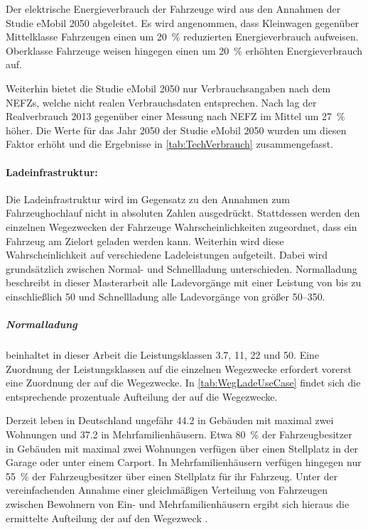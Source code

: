 

Der elektrische Energieverbrauch der Fahrzeuge wird aus den Annahmen der Studie \glqq eMobil \num{2050}\grqq{} \cite{Hacker2014} abgeleitet.
Es wird angenommen, dass Kleinwagen gegenüber Mittelklasse Fahrzeugen einen um \SI{20}{\percent} reduzierten Energieverbrauch aufweisen.
Oberklasse Fahrzeuge weisen hingegen einen um \SI{20}{\percent} erhöhten Energieverbrauch auf.\medskip

Weiterhin bietet die Studie \glqq eMobil \num{2050}\grqq{} nur Verbrauchsangaben nach dem \glspl{NEFZ}, welche nicht realen Verbrauchsdaten entsprechen.
Nach \cite{Heinfellner2015} lag der Realverbrauch \num{2013} gegenüber einer Messung nach \gls{NEFZ} im Mittel um \SI{27}{\percent} höher.
Die Werte für das Jahr \num{2050} der Studie \glqq eMobil \num{2050}\grqq{} wurden um diesen Faktor erhöht und die Ergebnisse in \autoref{tab:TechVerbrauch} zusammengefasst.




\paragraph{Ladeinfrastruktur:}

Die Ladeinfrastruktur wird im Gegensatz zu den Annahmen zum Fahrzeughochlauf nicht in absoluten Zahlen ausgedrückt.
Stattdessen werden den einzelnen Wegezwecken der Fahrzeuge Wahrscheinlichkeiten zugeordnet, dass ein Fahrzeug am Zielort geladen werden kann.
Weiterhin wird diese Wahrscheinlichkeit auf verschiedene Ladeleistungen aufgeteilt.
Dabei wird grundsätzlich zwischen Normal- und Schnellladung unterschieden.
Normalladung beschreibt in dieser Masterarbeit alle Ladevorgänge mit einer Leistung von bis zu einschließlich \SI{50}{\kw} und Schnellladung alle Ladevorgänge von größer \SIrange[range-phrase=~bis~einschließlich~]{50}{350}{\kw}.


\subparagraph{Normalladung} beinhaltet in dieser Arbeit die Leistungsklassen \SI{3.7}{\kw}, \SI{11}{\kw}, \SI{22}{\kw} und \SI{50}{\kw}.
Eine Zuordnung der Leistungsklassen auf die einzelnen Wegezwecke erfordert vorerst eine Zuordnung der \UCs auf die Wegezwecke.
In \autoref{tab:WegLadeUseCase} findet sich die entsprechende prozentuale Aufteilung der \UCs auf die Wegezwecke.



Derzeit leben in Deutschland ungefähr \SI{44.2}{\MioMen} in Gebäuden mit maximal zwei Wohnungen und \SI{37.2}{\MioMen} in Mehrfamilienhäusern.
Etwa \SI{80}{\percent} der Fahrzeugbesitzer in Gebäuden mit maximal zwei Wohnungen verfügen über einen Stellplatz in der Garage oder unter einem Carport.
In Mehrfamilienhäusern verfügen hingegen nur \SI{55}{\percent} der Fahrzeugbesitzer über einen Stellplatz für ihr Fahrzeug. \cite{dena2020}
Unter der vereinfachenden Annahme einer gleichmäßigen Verteilung von Fahrzeugen zwischen Bewohnern von Ein- und Mehrfamilienhäusern ergibt sich hieraus die ermittelte Aufteilung der \UCs auf den Wegezweck \nHdot.\medskip

